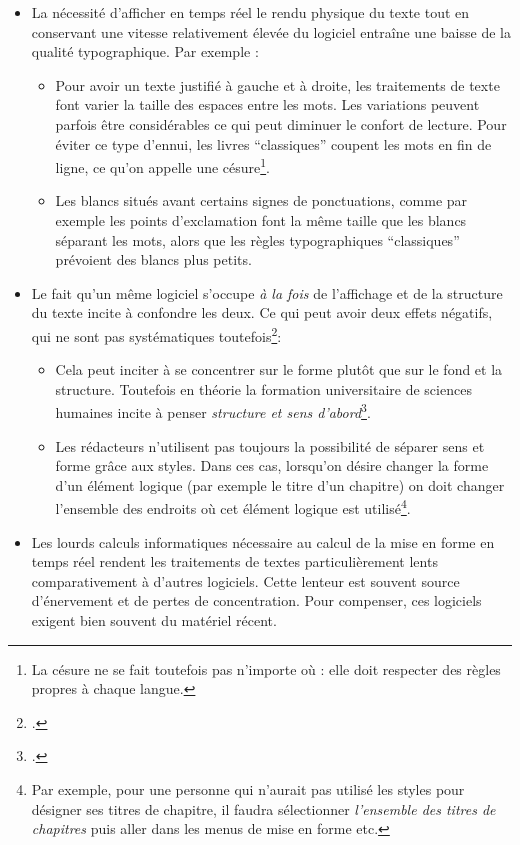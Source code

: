 \begin{itemize}
\item La nécessité d'afficher en temps réel le rendu physique du texte tout en conservant une vitesse relativement élevée du logiciel entraîne une baisse de la qualité typographique. Par exemple :
	\begin{itemize}
		\item Pour avoir un texte justifié à gauche et à droite, les traitements de texte font varier la taille des espaces entre les mots. Les variations peuvent parfois être considérables ce qui peut diminuer le confort de lecture. Pour éviter ce type d'ennui, les livres \enquote{classiques} coupent les mots en fin de ligne, ce qu'on appelle une césure\footnote{La césure ne se fait toutefois pas n'importe où : elle doit respecter des règles propres à chaque langue.}.
		\item Les blancs situés avant certains signes de ponctuations, comme par exemple les points d'exclamation font la même taille que les blancs séparant les mots, alors que les règles typographiques \enquote{classiques} prévoient des blancs plus petits.
	\end{itemize}
\item Le fait qu'un même logiciel s'occupe \emph{à la fois} de l'affichage et de la structure du texte incite à confondre les deux. Ce qui peut avoir deux effets négatifs, qui ne sont pas systématiques toutefois\footcite[Les auteurs de ces lignes sont moins sévères envers les traitements de texte que d'autres LaTeXiens : \cf][]{stupide}:
	\begin{itemize}
		\item Cela peut inciter à se concentrer sur le forme plutôt que sur le fond et la structure. Toutefois en théorie la formation universitaire de sciences humaines incite à penser \emph{structure et sens d'abord}\footcite[Voir un débat sur le blog d'un des auteurs]{structurevsforme}. 
		\item Les rédacteurs n'utilisent pas toujours la possibilité de séparer sens et forme grâce aux styles. Dans ces cas, lorsqu'on désire changer la forme d'un élément logique (par exemple le titre d'un chapitre) on doit changer l'ensemble des endroits où cet élément logique est utilisé\footnote{Par exemple, pour une personne  qui n'aurait pas utilisé les styles pour désigner ses titres de chapitre, il faudra sélectionner \emph{l'ensemble des titres de chapitres} puis aller dans les menus de mise en forme etc.}.
	\end{itemize}

\item Les lourds calculs informatiques nécessaire au calcul de la mise en forme en temps réel rendent les traitements de textes particulièrement lents comparativement à d'autres logiciels. Cette lenteur est souvent source d'énervement et de pertes de concentration. Pour compenser, ces logiciels exigent bien souvent du matériel récent.
\end{itemize}

